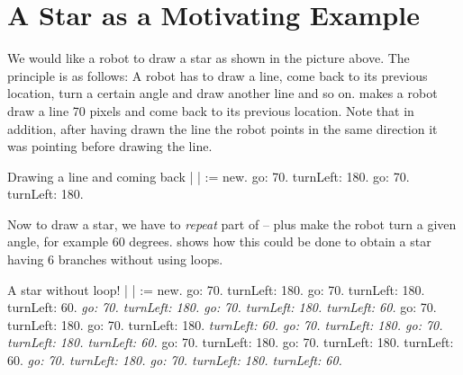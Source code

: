 \section{A Star as a Motivating Example}
We would like \newcommand{\remove}[1]{that} a robot \newcommand{\replace}[2]{draws}{to draw} a star as shown in the picture above. The principle is \newcommand{\replace}[2]{the following one}{as follows}: A robot has to draw a line, \newcommand{\replace}[2]{comes}{come} back to its previous location, \newcommand{\replace}[2]{turns from}{turn} a certain angle and \newcommand{\replace}[2]{draws}{draw} another line \newcommand{\add}[1]{--} and so on. \newcommand{\add}[1]{\paragraph
}
\newcommand{\remove}[1]{The}  makes a robot \newcommand{\replace}[2]{drawing}{draw} a line \newcommand{\remove}[1]{of} 70 pixels \newcommand{\add}[1]{long}
and \newcommand{\replace}[2]{coming}{come} back to its previous location. Note that in addition, after having drawn the line the robot points in the same direction \newcommand{\remove}[1]{where} it was pointing before drawing the line.

\begin{scriptwithtitle}{Drawing a line and coming back}\label{scr:line}
| \caro |
\caro := \Turtle new.
\caro go: 70.
\caro turnLeft: 180.
\caro go: 70.
\caro turnLeft: 180.
\end{scriptwithtitle}

Now to draw a star, we have to \emph{repeat} part of \newcommand{\remove}[1]{the}  \newcommand{\replace}[2]{and}{-- plus} make the robot \newcommand{\replace}[2]{turns from}{turn} a given angle, for example 60
degrees. \newcommand{\remove}[1]{The}  shows how this \newcommand{\replace}[2]{should}{could} be done to
obtain a star having 6 branches without using loops.

\begin{scriptwithtitle}{A star without loop!}\label{scr:star}
| \caro |
\caro := \Turtle new.
\caro go: 70.
\caro turnLeft: 180.
\caro go: 70.
\caro turnLeft: 180.
\caro turnLeft: 60. 
\textit{\caro go: 70.
\caro turnLeft: 180.
\caro go: 70.
\caro turnLeft: 180.
\caro turnLeft: 60.}
\caro go: 70.
\caro turnLeft: 180.
\caro go: 70.
\caro turnLeft: 180.
\textit{\caro turnLeft: 60. 
\caro go: 70.
\caro turnLeft: 180.
\caro go: 70.
\caro turnLeft: 180.
\caro turnLeft: 60.} 
\caro go: 70.
\caro turnLeft: 180.
\caro go: 70.
\caro turnLeft: 180.
\caro turnLeft: 60. 
\textit{\caro go: 70.
\caro turnLeft: 180.
\caro go: 70.
\caro turnLeft: 180.
\caro turnLeft: 60.} 
\end{scriptwithtitle}

